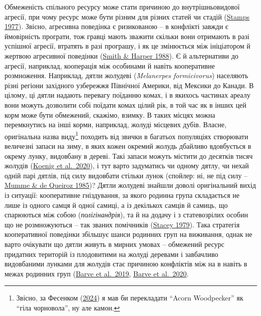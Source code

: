 \documentclass[
  11pt,
]{book}
\begin{document}
Обмеженість спільного ресурсу може стати причиною до внутрішньовидової агресії, при чому ресурс може бути різним для різних статей чи стадій (\href{https://doi.org/10.2307/1935609}{Stamps 1977}). Звісно, агресивна поведінка є ризикованою -- в конфлікті завжди є ймовірність програти, тож гравці мають зважити скільки вони отримають в разі успішної агресії, втратять в разі програшу, і як це змінюється між ініціатором й жертвою агресивної поведінки (\href{https://doi.org/10.1098/rstb.1988.0065}{Smith \& Harper 1988}). Є й альтернативи до агресії, наприклад, кооперація між особинами й навіть кооперативне розмноження. Наприклад, дятли жолудеві (\emph{Melanerpes formicivorus}) населяють різні регіони західного узбережжя Північної Америки, від Мексики до Канади. В цілому, ці дятли надають перевагу поїданню комах, і в якихось частинах ареалу вони можуть дозволити собі поїдати комах цілий рік, в той час як в інших цей корм може бути обмежений, скажімо, взимку. В таких місцях можна перемкнутись на інші корми, наприклад, жолуді місцевих дубів. Власне, оригінальна назва виду\footnote{Звісно, за Фесенком (\href{https://www.researchgate.net/publication/380547605}{2024}) я мав би перекладати ``Acorn Woodpecker'' як ``гіла чорновола'', ну але камон.} походить від звички в багатьох популяціях створювати величезні запаси на зиму, в яких кожен окремий жолудь дбайливо вдовбується в окрему лунку, видовбану в дереві. Такі запаси можуть містити до десятків тисяч жолудів (\href{https://doi.org/10.2173/bow.acowoo.01}{Koenig et al.~2020}), і тут варто задуматись чи одному дятлу, чи нехай одній парі дятлів, під силу видовбати стільки лунок (спойлер: ні, не під силу -- \href{https://www.jstor.org/stable/4534488}{Mumme \& de Queiroz 1985})? Дятли жолудеві знайшли доволі оригінальний вихід із ситуації: кооперативне гніздування, за якого родинна група складається не лише із одного самця й одної самиці, а із декількох самців й самиць, що спарюються між собою (\emph{полігінандрія}), та й на додачу і з статевозрілих особин що не розмножуються -- так званих помічників (\href{https://doi.org/10.1007/BF00293245}{Stacey 1979}). Така стратегія кооперативної поведінки збільшує шанси родинних груп на виживання, однак не варто очікувати що дятли живуть в мирних умовах -- обмежений ресурс придатних територій із плодовитими на жолуді деревами і завбачливо видовбаними лунками для жолудів стає причиною конфліктів між на в навіть в межах родинних груп (\href{https://doi.org/10.1086/703188}{Barve et al.~2019}, \href{https://doi.org/10.1016/j.cub.2020.07.073}{Barve et al.~2020}.
\end{document}
